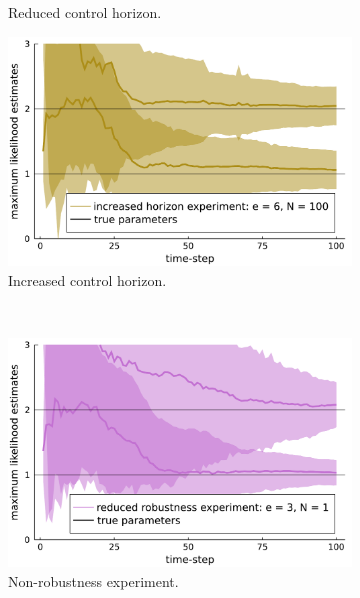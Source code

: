 \begin{figure}[H]
\begin{subfigure}[b]{0.45\textwidth}
		\caption{Reduced control horizon.}
		\label{figEnsembleRedHor}
	\end{subfigure}
	\begin{subfigure}[b]{0.45\textwidth}
		\centering
		\includegraphics[width=1.0\textwidth]{figure/paper 3/ensemble online estimate increased adaptivity}
		\caption{Increased control horizon.}
		\label{figEnsembleIncrHor}
	\end{subfigure}\\
	\begin{subfigure}[b]{0.45\textwidth}
		\includegraphics[width=1.0\textwidth]{figure/paper 3/ensemble online estimate reduced robustness}
		\caption{Non-robustness experiment.}
		\label{figEnsembleRedRob}
	\end{subfigure}
	\begin{subfigure}[b]{0.45\textwidth}
		\centering

\end{subfigure}
\end{figure}

